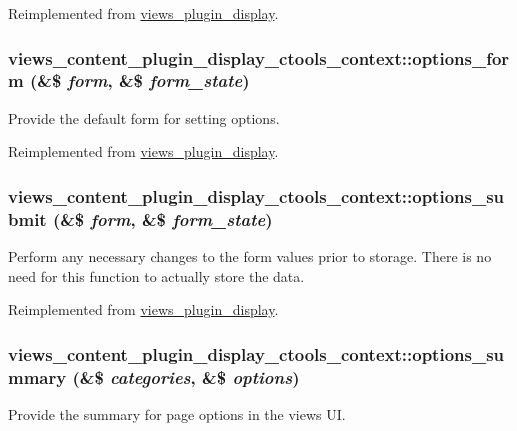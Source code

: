 Reimplemented from \hyperlink{classviews__plugin__display_a03f77cb37c3c3219d031c153aa59d20e}{views\_\-plugin\_\-display}.\hypertarget{classviews__content__plugin__display__ctools__context_a7915e29e242e5accfa74ea8ceaa20b90}{
\subsubsection[{options\_\-form}]{\setlength{\rightskip}{0pt plus 5cm}views\_\-content\_\-plugin\_\-display\_\-ctools\_\-context::options\_\-form (\&\$ {\em form}, \/  \&\$ {\em form\_\-state})}}
\label{classviews__content__plugin__display__ctools__context_a7915e29e242e5accfa74ea8ceaa20b90}
Provide the default form for setting options. 

Reimplemented from \hyperlink{classviews__plugin__display_ad9c69d91ea1165ff51dcd1f1f6d3a154}{views\_\-plugin\_\-display}.\hypertarget{classviews__content__plugin__display__ctools__context_a8fa3f9293bec2891e2e87249ad748c67}{
\subsubsection[{options\_\-submit}]{\setlength{\rightskip}{0pt plus 5cm}views\_\-content\_\-plugin\_\-display\_\-ctools\_\-context::options\_\-submit (\&\$ {\em form}, \/  \&\$ {\em form\_\-state})}}
\label{classviews__content__plugin__display__ctools__context_a8fa3f9293bec2891e2e87249ad748c67}
Perform any necessary changes to the form values prior to storage. There is no need for this function to actually store the data. 

Reimplemented from \hyperlink{classviews__plugin__display_a75f0b2d5587b365640fcb4d414daae36}{views\_\-plugin\_\-display}.\hypertarget{classviews__content__plugin__display__ctools__context_a3299f180dd1ea735064cb7d63fd61774}{
\subsubsection[{options\_\-summary}]{\setlength{\rightskip}{0pt plus 5cm}views\_\-content\_\-plugin\_\-display\_\-ctools\_\-context::options\_\-summary (\&\$ {\em categories}, \/  \&\$ {\em options})}}
\label{classviews__content__plugin__display__ctools__context_a3299f180dd1ea735064cb7d63fd61774}
Provide the summary for page options in the views UI.

